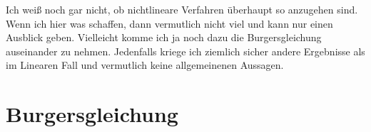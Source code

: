 Ich weiß noch gar nicht, ob nichtlineare Verfahren überhaupt so anzugehen sind.
Wenn ich hier was schaffen, dann vermutlich nicht viel und kann nur einen Ausblick geben.
Vielleicht komme ich ja noch dazu die Burgersgleichung auseinander zu nehmen.
Jedenfalls kriege ich ziemlich sicher andere Ergebnisse als im Linearen Fall und vermutlich keine allgemeinenen Aussagen.

\section{Burgersgleichung}